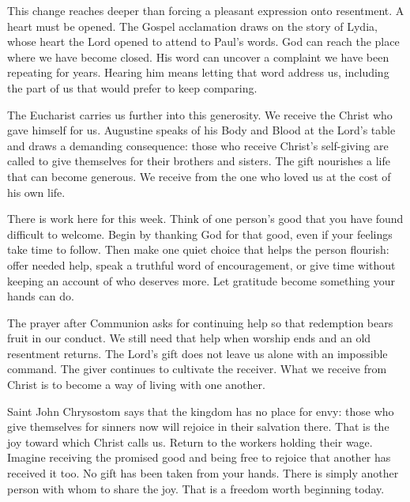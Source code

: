 This change reaches deeper than forcing a pleasant expression onto resentment. A heart must be opened. The Gospel acclamation draws on the story of Lydia, whose heart the Lord opened to attend to Paul's words. God can reach the place where we have become closed. His word can uncover a complaint we have been repeating for years. Hearing him means letting that word address us, including the part of us that would prefer to keep comparing.

The Eucharist carries us further into this generosity. We receive the Christ who gave himself for us. Augustine speaks of his Body and Blood at the Lord's table and draws a demanding consequence: those who receive Christ's self-giving are called to give themselves for their brothers and sisters. The gift nourishes a life that can become generous. We receive from the one who loved us at the cost of his own life.

There is work here for this week. Think of one person's good that you have found difficult to welcome. Begin by thanking God for that good, even if your feelings take time to follow. Then make one quiet choice that helps the person flourish: offer needed help, speak a truthful word of encouragement, or give time without keeping an account of who deserves more. Let gratitude become something your hands can do.

The prayer after Communion asks for continuing help so that redemption bears fruit in our conduct. We still need that help when worship ends and an old resentment returns. The Lord's gift does not leave us alone with an impossible command. The giver continues to cultivate the receiver. What we receive from Christ is to become a way of living with one another.

Saint John Chrysostom says that the kingdom has no place for envy: those who give themselves for sinners now will rejoice in their salvation there. That is the joy toward which Christ calls us. Return to the workers holding their wage. Imagine receiving the promised good and being free to rejoice that another has received it too. No gift has been taken from your hands. There is simply another person with whom to share the joy. That is a freedom worth beginning today.
